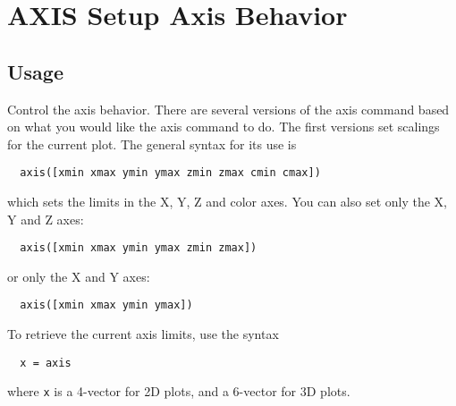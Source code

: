 \section{AXIS Setup Axis Behavior}

\subsection{Usage}

Control the axis behavior.  There are several versions of the
axis command based on what you would like the axis command to
do.  The first versions set scalings for the current plot.
The general syntax for its use is
\begin{verbatim}
  axis([xmin xmax ymin ymax zmin zmax cmin cmax])
\end{verbatim}
which sets the limits in the X, Y, Z and color axes.  You can
also set only the X, Y and Z axes:
\begin{verbatim}
  axis([xmin xmax ymin ymax zmin zmax])
\end{verbatim}
or only the X and Y axes:
\begin{verbatim}
  axis([xmin xmax ymin ymax])
\end{verbatim}
To retrieve the current axis limits, use the syntax
\begin{verbatim}
  x = axis
\end{verbatim}
where \verb|x| is a 4-vector for 2D plots, and a 6-vector for
3D plots.

